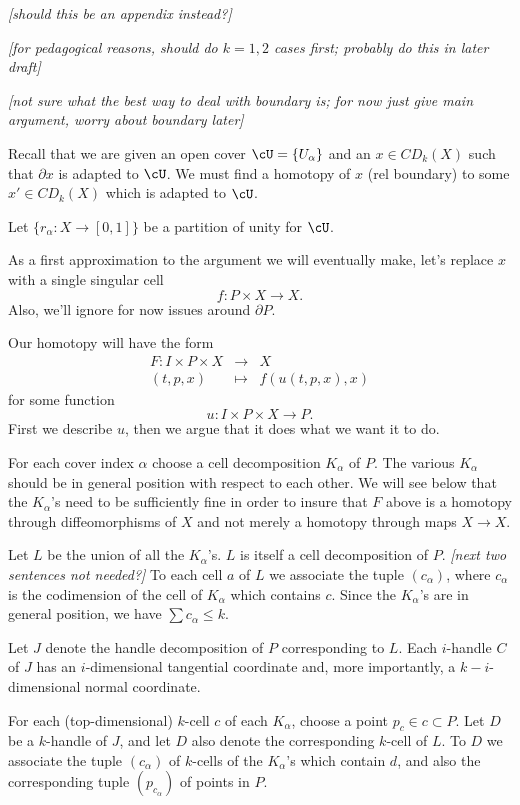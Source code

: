 \documentclass[11pt,leqno]{amsart}
\def\bd{\partial}
\def\sub{\subset}
\def\nn#1{{{\it \small [#1]}}}
\newcommand{\eq}[1]{\begin{displaymath}#1\end{displaymath}}
\newcommand{\eqar}[1]{\begin{eqnarray*}#1\end{eqnarray*}}
\begin{document}
\nn{should this be an appendix instead?}

\nn{for pedagogical reasons, should do $k=1,2$ cases first; probably do this in
later draft}

\nn{not sure what the best way to deal with boundary is; for now just give main argument, worry
about boundary later}

Recall that we are given
an open cover $\cU = \{U_\alpha\}$ and an
$x \in CD_k(X)$ such that $\bd x$ is adapted to $\cU$.
We must find a homotopy of $x$ (rel boundary) to some $x' \in CD_k(X)$ which is adapted to $\cU$.

Let $\{r_\alpha : X \to [0,1]\}$ be a partition of unity for $\cU$.

As a first approximation to the argument we will eventually make, let's replace $x$
with a single singular cell
\eq{
    f: P \times X \to X .
}
Also, we'll ignore for now issues around $\bd P$.

Our homotopy will have the form
\eqar{
    F: I \times P \times X &\to& X \\
    (t, p, x) &\mapsto& f(u(t, p, x), x)
}
for some function
\eq{
    u : I \times P \times X \to P .
}
First we describe $u$, then we argue that it does what we want it to do.

For each cover index $\alpha$ choose a cell decomposition $K_\alpha$ of $P$.
The various $K_\alpha$ should be in general position with respect to each other.
We will see below that the $K_\alpha$'s need to be sufficiently fine in order
to insure that $F$ above is a homotopy through diffeomorphisms of $X$ and not
merely a homotopy through maps $X\to X$.

Let $L$ be the union of all the $K_\alpha$'s.
$L$ is itself a cell decomposition of $P$.
\nn{next two sentences not needed?}
To each cell $a$ of $L$ we associate the tuple $(c_\alpha)$,
where $c_\alpha$ is the codimension of the cell of $K_\alpha$ which contains $c$.
Since the $K_\alpha$'s are in general position, we have $\sum c_\alpha \le k$.

Let $J$ denote the handle decomposition of $P$ corresponding to $L$.
Each $i$-handle $C$ of $J$ has an $i$-dimensional tangential coordinate and,
more importantly, a $k{-}i$-dimensional normal coordinate.

For each (top-dimensional) $k$-cell $c$ of each $K_\alpha$, choose a point $p_c \in c \sub P$.
Let $D$ be a $k$-handle of $J$, and let $D$ also denote the corresponding
$k$-cell of $L$.
To $D$ we associate the tuple $(c_\alpha)$ of $k$-cells of the $K_\alpha$'s
which contain $d$, and also the corresponding tuple $(p_{c_\alpha})$ of points in $P$.
\end{document}

